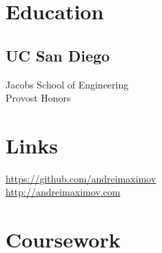 \documentclass[]{resume}
\begin{document}
%
%
\lastupdated

%
%



%
%

\begin{minipage}[t]{0.33\textwidth}


\section{Education}

\subsection{UC San Diego}
Jacobs School of Engineering \\
Provost Honors \\
\sectionsep


\section{Links}
\href{https://github.com/andreimaximov}{https://github.com/andreimaximov} \\
\href{http://andreimaximov.com}{http://andreimaximov.com} \\
\sectionsep


\section{Coursework}


\end{minipage}
\end{document}

